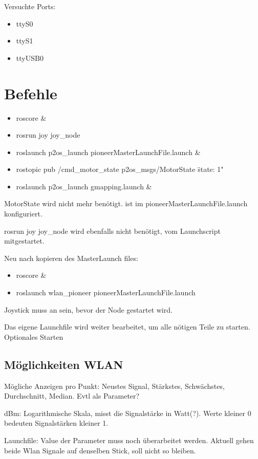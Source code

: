 \documentclass{scrartcl}%
\begin{document}
Versuchte Ports: 
\begin{itemize}
	\item ttyS0
	\item ttyS1
	\item ttyUSB0
\end{itemize}

\section{Befehle}

\begin{itemize}
	\item roscore \&
	\item rosrun joy joy\_node
	\item roslaunch p2os\_launch pioneerMasterLaunchFile.launch \&
	\item rostopic pub /cmd\_motor\_state p2os\_msgs/MotorState \"state: 1"
	\item roslaunch p2os\_launch gmapping.launch \&
\end{itemize}
MotorState wird nicht mehr benötigt. ist im pioneerMasterLaunchFile.launch konfiguriert.

rosrun joy joy\_node wird ebenfalls nicht benötigt, vom Launchscript mitgestartet.

Neu nach kopieren des MasterLaunch files:
\begin{itemize}
	\item roscore \&
	\item roslaunch wlan\_pioneer pioneerMasterLaunchFile.launch
\end{itemize}
Joystick muss an sein, bevor der Node gestartet wird.

Das eigene Launchfile wird weiter bearbeitet, um alle nötigen Teile zu starten. Optionales Starten 

\subsection{Möglichkeiten WLAN}
Mögliche Anzeigen pro Punkt: Neustes Signal, Stärkstes, Schwächstes, Durchschnitt, Median. Evtl als Parameter?

dBm: Logarithmische Skala, misst die Signalstärke in Watt(?). Werte kleiner 0 bedeuten Signalstärken kleiner 1.

Launchfile: Value der Parameter muss noch überarbeitet werden. Aktuell gehen beide Wlan Signale auf denselben Stick, soll nicht so bleiben.
\end{document}
